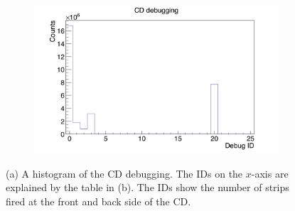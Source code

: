 \documentclass[twoside,english]{uiofysmaster/uiofysmaster}
\newcommand{\Sm}{$^{140}$Sm} %
\newcommand{\Pb}{$^{208}$Pb}
\begin{document}

\begin{figure}[htb]
	\centering
	\begin{subfigure}[b]{0.49\textwidth}
		\centering
		\includegraphics[width=\textwidth]{../Plots/plotting/cd_debug-user.png}
		\caption{}
	\end{subfigure}
	\hfill
	\begin{subfigure}[b]{0.49\textwidth}
		\centering
    		 \newline %
    		\caption{}
	\end{subfigure}
	\caption{(a) A histogram of the CD debugging. The IDs on the $x$-axis are explained by the table in (b). The IDs show the number of strips fired at the front and back side of the CD.}
	\label{fig:CD_debug}
\end{figure}
\end{document}
